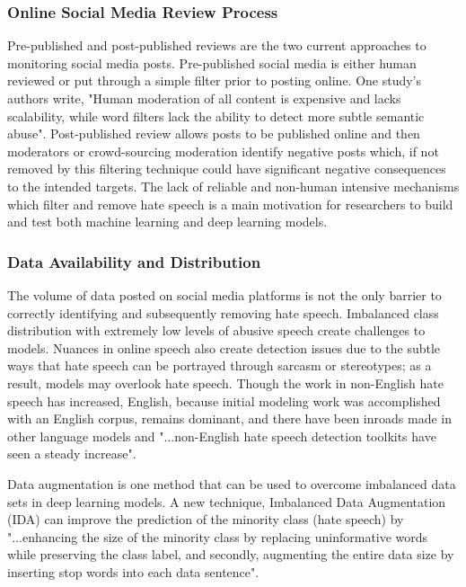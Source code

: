 \documentclass[conference]{IEEEtran}
\begin{document}
\subsubsection{Online Social Media Review Process}
Pre-published and post-published reviews are the two current approaches to monitoring social media posts. Pre-published social media is either human reviewed or put through a simple filter prior to posting online. One study's authors write, "Human moderation of all content is expensive and lacks scalability, while word filters lack the ability to detect more subtle semantic abuse"\cite{b11}. Post-published review allows posts to be published online and then moderators or crowd-sourcing moderation identify negative posts which, if not removed by this filtering technique could have significant negative consequences to the intended targets\cite{b11}. The lack of reliable and non-human intensive mechanisms which filter and remove hate speech is a main motivation for researchers to build and test both machine learning and deep learning models. 

\subsubsection{Data Availability and Distribution}
The volume of data posted on social media platforms is not the only barrier to correctly identifying and subsequently removing hate speech. Imbalanced class distribution with extremely low levels of abusive speech create challenges to models\cite{b11}. Nuances in online speech also create detection issues due to the subtle ways that hate speech can be portrayed through sarcasm or stereotypes\cite{b12}; as a result, models may overlook hate speech. Though the work in non-English hate speech has increased, English, because initial modeling work was accomplished with an English corpus, remains dominant, and there have been inroads made in other language models and "...non-English hate speech detection toolkits have seen a steady increase"\cite{b10}.

Data augmentation is one method that can be used to overcome imbalanced data sets in deep learning models. A new technique, Imbalanced Data Augmentation (IDA) can improve the prediction of the minority class (hate speech) by "...enhancing the size of the minority class by replacing uninformative words while preserving the class label, and secondly, augmenting the entire data size by inserting stop words into each data sentence"\cite{b13}.  
\end{document}
